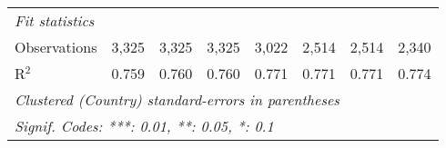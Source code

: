 \begin{tabular}{lccccccc}
   \midrule \emph{Fit statistics}\\
   Observations                                                                 & 3,325        & 3,325        & 3,325        & 3,022         & 2,514        & 2,514        & 2,340\\  
   R$^2$                                                                        & 0.759        & 0.760        & 0.760        & 0.771         & 0.771        & 0.771        & 0.774\\  
   \midrule
   \multicolumn{8}{l}{\emph{Clustered (Country) standard-errors in parentheses}}\\
   \multicolumn{8}{l}{\emph{Signif. Codes: ***: 0.01, **: 0.05, *: 0.1}}\\
\end{tabular}
\par\endgroup


